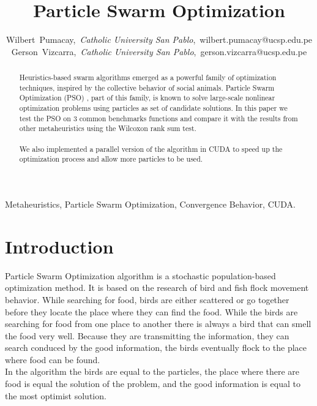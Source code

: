 \documentclass[journal]{IEEEtran}
\begin{document}
\title{Particle Swarm Optimization}

\author{Wilbert~Pumacay,~\textit{Catholic University San Pablo},~wilbert.pumacay@ucsp.edu.pe\\
        Gerson~Vizcarra,~\textit{Catholic University San Pablo},~gerson.vizcarra@ucsp.edu.pe}

\maketitle

\begin{abstract}
Heuristics-based swarm algorithms emerged as a powerful family of optimization techniques, inspired by the collective behavior of social animals. Particle Swarm Optimization (PSO) , part of this family, is known to solve large-scale nonlinear optimization problems using particles as set of candidate solutions. In this paper we test the PSO on 3 common benchmarks functions and compare it with the results from other metaheuristics using the Wilcoxon rank sum test. 
\\
\\
We also implemented a parallel version of the algorithm in CUDA to speed up the optimization process and allow more particles to be used.
\end{abstract}

\begin{IEEEkeywords}
Metaheuristics, Particle Swarm Optimization, Convergence Behavior, CUDA.
\end{IEEEkeywords}


\section{Introduction}

 Particle Swarm Optimization algorithm is a stochastic population-based optimization method. It is based on the research of bird and fish flock movement behavior. While searching for food, birds are either scattered or go together before they locate the place where they can find the food. While the birds are searching for food from one place to another there is always a bird that can smell the food very well. Because they are transmitting the information, they can search conduced by the good information, the birds eventually flock to the place where food can be found.\\
In the algorithm the birds are equal to the particles, the place where there are food is equal the solution of the problem, and the good information is equal to the most optimist solution.\\
\end{document}

